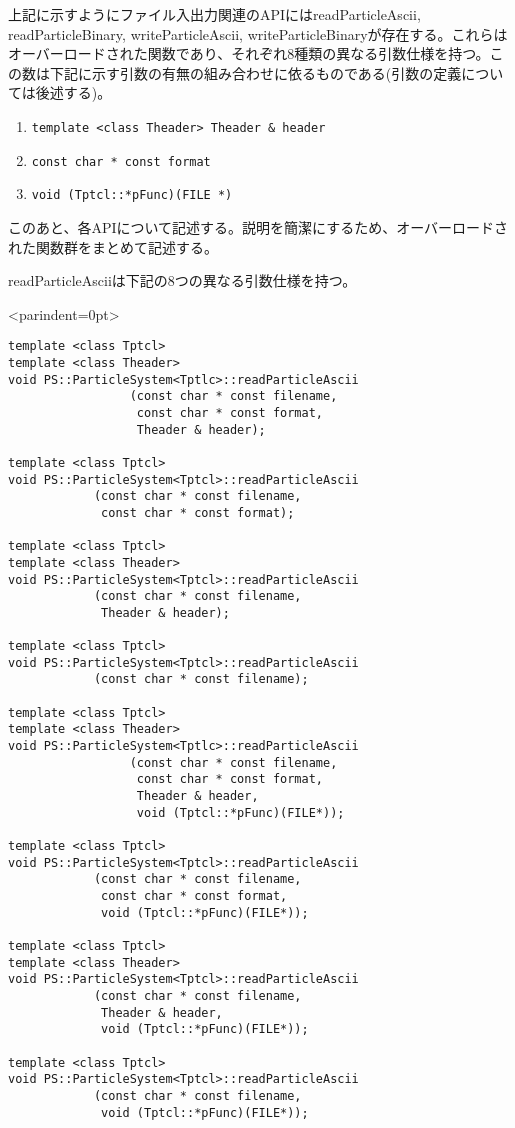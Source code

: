 上記に示すようにファイル入出力関連のAPIにはreadParticleAscii, readParticleBinary, writeParticleAscii, writeParticleBinaryが存在する。これらはオーバーロードされた関数であり、それぞれ8種類の異なる引数仕様を持つ。この数は下記に示す引数の有無の組み合わせに依るものである(引数の定義については後述する)。
\begin{enumerate}[itemsep=-1ex,label=\arabic*)]
\item \verb|template <class Theader> Theader & header|
\item \verb|const char * const format|
\item \verb|void (Tptcl::*pFunc)(FILE *)|
\end{enumerate}
このあと、各APIについて記述する。説明を簡潔にするため、オーバーロードされた関数群をまとめて記述する。

\label{sec:readParticleAscii}

readParticleAsciiは下記の8つの異なる引数仕様を持つ。
\begin{breakitembox}<parindent=0pt>{}
\begin{verbatim}
template <class Tptcl>
template <class Theader>
void PS::ParticleSystem<Tptlc>::readParticleAscii
                 (const char * const filename,
                  const char * const format,
                  Theader & header);
                  
template <class Tptcl>
void PS::ParticleSystem<Tptcl>::readParticleAscii
            (const char * const filename,
             const char * const format);
             
template <class Tptcl>
template <class Theader>
void PS::ParticleSystem<Tptcl>::readParticleAscii
            (const char * const filename,
             Theader & header);
             
template <class Tptcl>
void PS::ParticleSystem<Tptcl>::readParticleAscii
            (const char * const filename);
            
template <class Tptcl>
template <class Theader>
void PS::ParticleSystem<Tptlc>::readParticleAscii
                 (const char * const filename,
                  const char * const format,
                  Theader & header,
                  void (Tptcl::*pFunc)(FILE*));
                  
template <class Tptcl>
void PS::ParticleSystem<Tptcl>::readParticleAscii
            (const char * const filename,
             const char * const format,
             void (Tptcl::*pFunc)(FILE*));
             
template <class Tptcl>
template <class Theader>
void PS::ParticleSystem<Tptcl>::readParticleAscii
            (const char * const filename,
             Theader & header,
             void (Tptcl::*pFunc)(FILE*));
             
template <class Tptcl>
void PS::ParticleSystem<Tptcl>::readParticleAscii
            (const char * const filename,
             void (Tptcl::*pFunc)(FILE*));
\end{verbatim}
\end{breakitembox}


